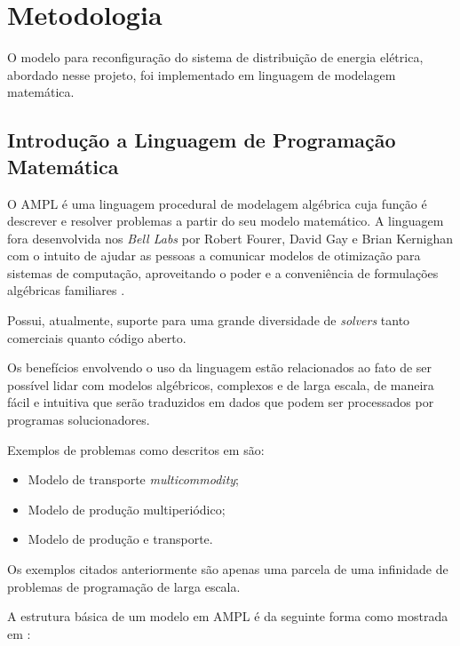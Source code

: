 \section{Metodologia}

O modelo para reconfiguração do sistema de distribuição de energia elétrica, abordado nesse projeto, foi implementado em linguagem de modelagem matemática.

\subsection{Introdução a Linguagem de Programação Matemática}

O AMPL é uma linguagem procedural de modelagem algébrica cuja função é descrever e resolver problemas a partir do seu modelo matemático. 
A linguagem fora desenvolvida nos \emph{Bell Labs} por Robert Fourer, David Gay e Brian Kernighan com o intuito de ajudar as pessoas a comunicar modelos de otimização para sistemas de computação, aproveitando o poder e a conveniência de formulações algébricas familiares \cite{ampl}. 

Possui, atualmente, suporte para uma grande diversidade de \textit{solvers} tanto comerciais quanto código aberto.


Os benefícios envolvendo o uso da linguagem estão relacionados ao fato de ser possível lidar com modelos algébricos, complexos e de larga escala, de maneira fácil e intuitiva que serão traduzidos em dados que podem ser processados por programas solucionadores.

Exemplos de problemas como descritos em \cite{Fourer2003AMPLProgramming} são:

\begin{itemize}
    \item Modelo de transporte \textit{multicommodity};
    
    \item Modelo de produção multiperiódico;
    
    \item Modelo de produção e transporte.
\end{itemize}

Os exemplos citados anteriormente são apenas uma parcela de uma infinidade de problemas de programação de larga escala.


A estrutura básica de um modelo em AMPL é da seguinte forma como mostrada em \cite{taha2008pesquisa}:

